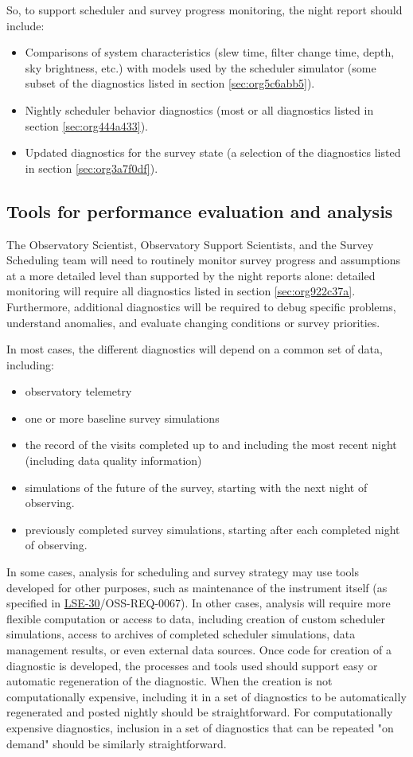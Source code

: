 So, to support scheduler and survey progress monitoring, the night report should include:
\begin{itemize}
\item Comparisons of system characteristics (slew time, filter change time, depth, sky brightness, etc.) with models used by the scheduler simulator (some subset of the diagnostics listed in section \ref{sec:org5c6abb5}).
\item Nightly scheduler behavior diagnostics (most or all diagnostics listed in section \ref{sec:org444a433}).
\item Updated diagnostics for the survey state (a selection of the diagnostics listed in section \ref{sec:org3a7f0df}).
\end{itemize}

\subsection{Tools for performance evaluation and analysis}
\label{sec:orgcdb7e30}
The Observatory Scientist, Observatory Support Scientists, and the Survey Scheduling team will need to routinely monitor survey progress and assumptions at a more detailed level than supported by the night reports alone:
detailed monitoring will require all diagnostics listed in section \ref{sec:org922c37a}.
Furthermore, additional diagnostics will be required to debug specific problems, understand anomalies, and evaluate changing conditions or survey priorities.

In most cases, the different diagnostics will depend on a common set of data, including:
\begin{itemize}
\item observatory telemetry
\item one or more baseline survey simulations
\item the record of the visits completed up to and including the most recent night (including data quality information)
\item simulations of the future of the survey, starting with the next night of observing.
\item previously completed survey simulations, starting after each completed night of observing.
\end{itemize}

In some cases, analysis for scheduling and survey strategy may use tools developed for other purposes, such as maintenance of the instrument itself (as specified in \href{https://ls.st/lse-30}{LSE-30}/OSS-REQ-0067).
In other cases, analysis will require more flexible computation or access to data, including creation of custom scheduler simulations, access to archives of completed scheduler simulations, data management results, or even external data sources.
Once code for creation of a diagnostic is developed, the processes and tools used should support easy or automatic regeneration of the diagnostic.
When the creation is not computationally expensive, including it in a set of diagnostics to be automatically regenerated and posted nightly should be straightforward.
For computationally expensive diagnostics, inclusion in a set of diagnostics that can be repeated "on demand" should be similarly straightforward.

